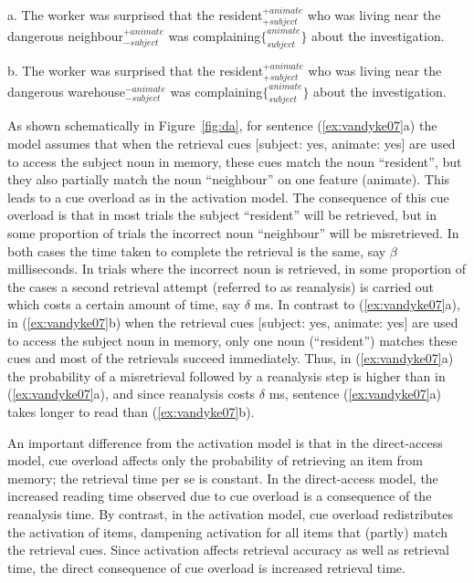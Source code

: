\documentclass{cambridge7A}\usepackage[]{graphicx}\usepackage[]{color}
\begin{document}
\begin{exe}
\ex \label{ex:vandyke07}
\begin{xlist}
\item[a.]
The worker was surprised that the resident$^{+animate}_{+subject}$ who was living near the dangerous neighbour$^{+animate}_{-subject}$ was complaining$\{^{animate}_{subject}\}$ about the investigation.
\item[b.]
The worker was surprised that the resident$^{+animate}_{+subject}$ who was living near the dangerous warehouse$^{-animate}_{-subject}$ was complaining$\{^{animate}_{subject}\}$ about the investigation.
\end{xlist}
\end{exe}

As shown schematically in Figure~\ref{fig:da}, for sentence (\ref{ex:vandyke07}a) the model assumes that when the retrieval cues [subject: yes, animate: yes] are used to access the subject noun in memory, these cues match the noun ``resident'', but they also partially match the noun ``neighbour'' on one feature (animate). This leads to a cue overload as in the activation model. The consequence of this cue overload is that in most trials the subject ``resident'' will be retrieved, but in some proportion of trials the incorrect noun ``neighbour'' will be misretrieved. In both cases the time taken to complete the retrieval is the same, say $\beta$ milliseconds. In trials where the incorrect noun is retrieved, in some proportion of the cases a second retrieval attempt (referred to as reanalysis) is carried out which costs a certain amount of time, say $\delta$ ms. In contrast to (\ref{ex:vandyke07}a), in (\ref{ex:vandyke07}b)  when the retrieval cues [subject: yes, animate: yes] are used to access the subject noun in memory, only one noun (``resident'') matches these cues and most of the retrievals succeed immediately. Thus, in (\ref{ex:vandyke07}a) the probability of a misretrieval followed by a reanalysis step is higher than in (\ref{ex:vandyke07}a), and since reanalysis costs $\delta$ ms, sentence (\ref{ex:vandyke07}a) takes longer to read than (\ref{ex:vandyke07}b). 

An important difference from the activation model is that in the direct-access model, cue overload affects only the probability of retrieving an item from memory; the retrieval time per se is constant. In the direct-access model, the increased reading time observed due to cue overload is a consequence of the reanalysis time. 
By contrast, in the activation model, cue overload redistributes the activation of items, dampening activation for all items that (partly) match the retrieval cues. Since activation affects retrieval accuracy as well as retrieval time, the direct consequence of cue overload is increased retrieval time. 
\end{document}
